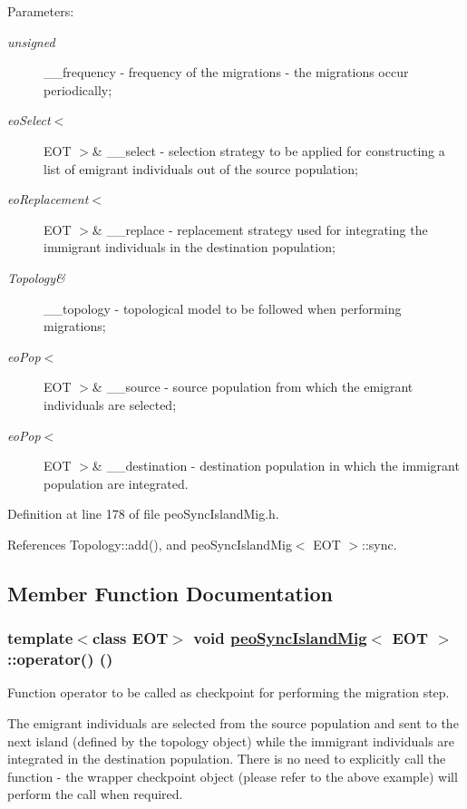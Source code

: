 \begin{Desc}
\item[Parameters:]
\begin{description}
\item[{\em unsigned}]\_\-\_\-frequency - frequency of the migrations - the migrations occur periodically; \item[{\em eo\-Select$<$}]EOT $>$\& \_\-\_\-select - selection strategy to be applied for constructing a list of emigrant individuals out of the source population; \item[{\em eo\-Replacement$<$}]EOT $>$\& \_\-\_\-replace - replacement strategy used for integrating the immigrant individuals in the destination population; \item[{\em Topology\&}]\_\-\_\-topology - topological model to be followed when performing migrations; \item[{\em eo\-Pop$<$}]EOT $>$\& \_\-\_\-source - source population from which the emigrant individuals are selected; \item[{\em eo\-Pop$<$}]EOT $>$\& \_\-\_\-destination - destination population in which the immigrant population are integrated. \end{description}
\end{Desc}


Definition at line 178 of file peo\-Sync\-Island\-Mig.h.

References Topology::add(), and peo\-Sync\-Island\-Mig$<$ EOT $>$::sync.

\subsection{Member Function Documentation}
\hypertarget{classpeoSyncIslandMig_178476fd276f78b73607b33d19522c36}{
\subsubsection[operator()]{\setlength{\rightskip}{0pt plus 5cm}template$<$class EOT$>$ void \hyperlink{classpeoSyncIslandMig}{peo\-Sync\-Island\-Mig}$<$ EOT $>$::operator() ()}}
\label{classpeoSyncIslandMig_178476fd276f78b73607b33d19522c36}


Function operator to be called as checkpoint for performing the migration step. 

The emigrant individuals are selected from the source population and sent to the next island (defined by the topology object) while the immigrant individuals are integrated in the destination population. There is no need to explicitly call the function - the wrapper checkpoint object (please refer to the above example) will perform the call when required. 

